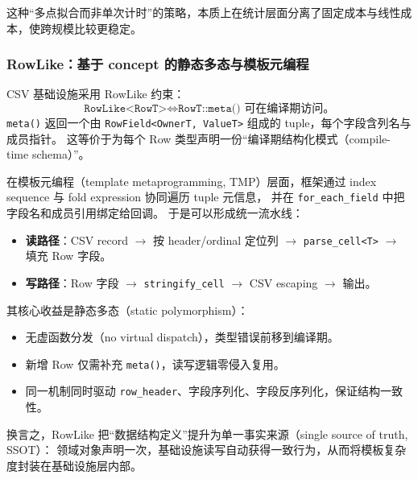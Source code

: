 这种“多点拟合而非单次计时”的策略，本质上在统计层面分离了固定成本与线性成本，使跨规模比较更稳定。

\subsubsection{RowLike：基于 concept 的静态多态与模板元编程}

CSV 基础设施采用 RowLike 约束：
\begin{equation}
    \texttt{RowLike<RowT>} \iff \texttt{RowT::meta()} \text{ 可在编译期访问。}
\end{equation}
\texttt{meta()} 返回一个由 \texttt{RowField<OwnerT, ValueT>} 组成的 tuple，每个字段含列名与成员指针。
这等价于为每个 Row 类型声明一份“编译期结构化模式（compile-time schema）”。

在模板元编程（template metaprogramming, TMP）层面，框架通过 index sequence 与 fold expression 协同遍历 tuple 元信息，
并在 \texttt{for\_each\_field} 中把字段名和成员引用绑定给回调。
于是可以形成统一流水线：
\begin{itemize}
    \item \textbf{读路径}：CSV record $\rightarrow$ 按 header/ordinal 定位列 $\rightarrow$ \texttt{parse\_cell<T>} $\rightarrow$ 填充 Row 字段。
    \item \textbf{写路径}：Row 字段 $\rightarrow$ \texttt{stringify\_cell} $\rightarrow$ CSV escaping $\rightarrow$ 输出。
\end{itemize}

其核心收益是静态多态（static polymorphism）：
\begin{itemize}
    \item 无虚函数分发（no virtual dispatch），类型错误前移到编译期。
    \item 新增 Row 仅需补充 \texttt{meta()}，读写逻辑零侵入复用。
    \item 同一机制同时驱动 \texttt{row\_header}、字段序列化、字段反序列化，保证结构一致性。
\end{itemize}

换言之，RowLike 把“数据结构定义”提升为单一事实来源（single source of truth, SSOT）：
领域对象声明一次，基础设施读写自动获得一致行为，从而将模板复杂度封装在基础设施层内部。